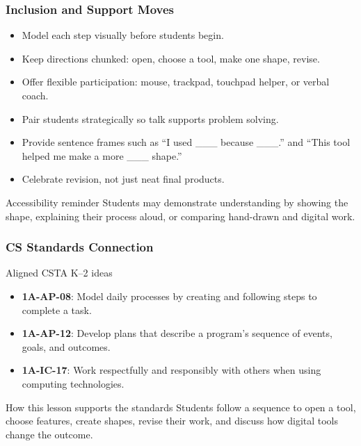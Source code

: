 \documentclass[aspectratio=169]{beamer}
\begin{document}
\begin{frame}[plain]
\frametitle{Inclusion and Support Moves}
\begin{itemize}
\large
\item Model each step visually before students begin.
\item Keep directions chunked: open, choose a tool, make one shape, revise.
\item Offer flexible participation: mouse, trackpad, touchpad helper, or verbal coach.
\item Pair students strategically so talk supports problem solving.
\item Provide sentence frames such as ``I used \_\_\_ because \_\_\_.'' and ``This tool helped me make a more \_\_\_ shape.''
\item Celebrate revision, not just neat final products.
\end{itemize}
\vspace{0.18cm}
\begin{block}{Accessibility reminder}
\large Students may demonstrate understanding by showing the shape, explaining their process aloud, or comparing hand-drawn and digital work.
\end{block}
\end{frame}

\begin{frame}[plain]
\frametitle{CS Standards Connection}
\begin{block}{Aligned CSTA K--2 ideas}
\begin{itemize}
\large
\item \textbf{1A-AP-08}: Model daily processes by creating and following steps to complete a task.
\item \textbf{1A-AP-12}: Develop plans that describe a program's sequence of events, goals, and outcomes.
\item \textbf{1A-IC-17}: Work respectfully and responsibly with others when using computing technologies.
\end{itemize}
\end{block}
\vspace{0.18cm}
\begin{block}{How this lesson supports the standards}
\large Students follow a sequence to open a tool, choose features, create shapes, revise their work, and discuss how digital tools change the outcome.
\end{block}
\end{frame}
\end{document}

